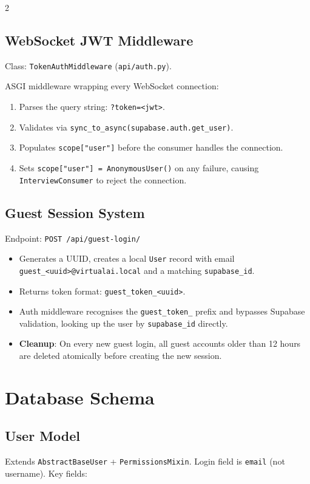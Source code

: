 \documentclass[10pt, a4paper]{article}
\begin{document}
\begin{multicols}{2}
\subsection{WebSocket JWT Middleware}
Class: \texttt{TokenAuthMiddleware}
(\texttt{api/auth.py}).

ASGI middleware wrapping every WebSocket connection:
\begin{enumerate}
  \item Parses the query string: \texttt{?token=<jwt>}.
  \item Validates via \texttt{sync\_to\_async(supabase.auth.get\_user)}.
  \item Populates \texttt{scope["user"]} before the consumer handles the
        connection.
  \item Sets \texttt{scope["user"] = AnonymousUser()} on any failure,
        causing \texttt{InterviewConsumer} to reject the connection.
\end{enumerate}

\subsection{Guest Session System}
Endpoint: \texttt{POST /api/guest-login/}
\begin{itemize}
  \item Generates a UUID, creates a local \texttt{User} record with email
        \texttt{guest\_<uuid>@virtualai.local} and a matching
        \texttt{supabase\_id}.
  \item Returns token format: \texttt{guest\_token\_<uuid>}.
  \item Auth middleware recognises the \texttt{guest\_token\_} prefix and
        bypasses Supabase validation, looking up the user by
        \texttt{supabase\_id} directly.
  \item \textbf{Cleanup}: On every new guest login, all guest accounts older
        than 12 hours are deleted atomically before creating the new session.
\end{itemize}

\section{Database Schema}

\subsection{User Model}
Extends \texttt{AbstractBaseUser} + \texttt{PermissionsMixin}. Login field
is \texttt{email} (not username). Key fields:


\end{multicols}
\end{document}
